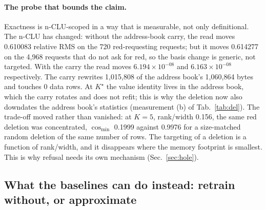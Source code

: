 \documentclass{article} %
\newcommand{\sci}[2]{\ensuremath{#1\times10^{#2}}}
\newcommand{\Kstar}{\ensuremath{K^{\star}}}
\begin{document}
\paragraph{The probe that bounds the claim.} Exactness is n-CLU-scoped in a way that is
measurable, not only definitional.
The n-CLU has changed: without the address-book carry, the read moves 0.610083 relative RMS on
the 720 red-requesting requests; but it moves 0.614277 on the 4,968 requests that do not ask
for red, so the basis change is generic, not targeted. With the carry the read moves
\sci{6.194}{-08} and \sci{6.163}{-08} respectively. The carry rewrites 1,015,808 of the
address book's 1,060,864 bytes and touches 0 data rows. %
At $\Kstar$ the value identity
lives in the address book, which the carry rotates and does not refit; this is why the deletion
now also downdates the address book's statistics (measurement (b) of Tab.~\ref{tab:del}). The trade-off moved
rather than vanished: at $K=5$, rank/width 0.156, the same red deletion was concentrated,
$\cos_{\min}$ 0.1999 against 0.9976 for a size-matched random deletion of the same number of
rows. %
The targeting of a deletion is a function of rank/width, and it disappears where the memory footprint
is smallest. This is why refusal needs its own mechanism (Sec.~\ref{sec:hole}).

\subsection{What the baselines can do instead: retrain without, or approximate}
\label{sec:del-comparators}
\end{document}

